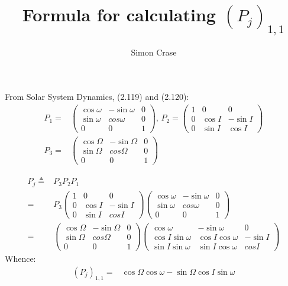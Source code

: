 \documentclass[]{article}
\title{Formula for calculating $(P_j)_{1,1}$}
\author{Simon Crase}
\begin{document}
\maketitle


From Solar System Dynamics, (2.119) and (2.120):
\begin{align}
P_1 =& \begin{pmatrix}
\cos \omega & - \sin \omega & 0\\
\sin \omega & cos \omega & 0\\
0 & 0  & 1
\end{pmatrix}
\text{, }
P_2 = \begin{pmatrix}
1 & 0 & 0\\
0 & \cos I & - \sin I\\
0 & \sin I & \cos I
\end{pmatrix}
\\
P_3 =& \begin{pmatrix}
\cos \Omega & - \sin \Omega & 0\\
\sin \Omega & cos \Omega & 0\\
0 & 0  & 1
\end{pmatrix}
\end{align}

\begin{align}
P_j \triangleq& P_3 P_2 P_1\\
 =& P_3 \begin{pmatrix}
1 & 0 & 0\\
0 & \cos I & - \sin I\\
0 & \sin I & cos I
\end{pmatrix}
\begin{pmatrix}
\cos \omega & - \sin \omega & 0\\
\sin \omega & cos \omega & 0\\
0 & 0  & 1
\end{pmatrix} \\
=& \begin{pmatrix}
\cos \Omega & - \sin \Omega & 0\\
\sin \Omega & cos \Omega & 0\\
0 & 0  & 1
\end{pmatrix}
\begin{pmatrix}
\cos \omega & -\sin \omega & 0\\
\cos I \sin \omega & \cos I \cos \omega & - \sin I\\
\sin I \sin \omega & \sin I \cos \omega & cos I
\end{pmatrix}
\end{align}
Whence:
\begin{align}
(P_j)_{1,1} =& \cos \Omega \cos \omega - \sin \Omega \cos I \sin \omega
\end{align}
\end{document}
